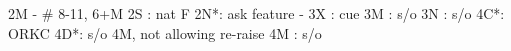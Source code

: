 2M - # 8-11, 6+M
2S : nat F
2N*: ask feature
   - 3X : cue
3M : s/o
3N : s/o
4C*: ORKC
4D*: s/o 4M, not allowing re-raise
4M : s/o